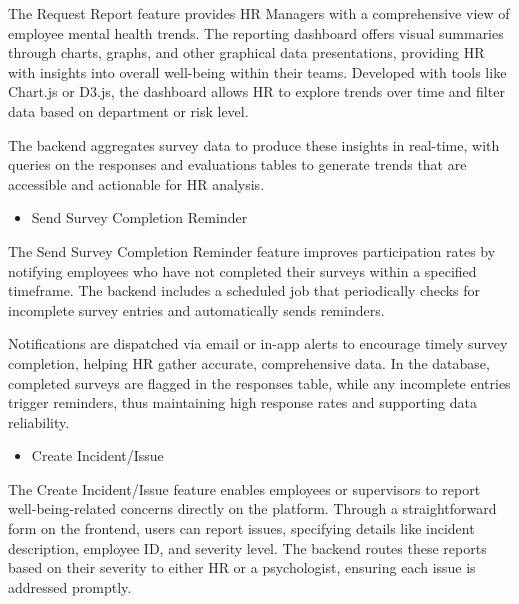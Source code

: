 \documentclass[conference]{IEEEtran}
\begin{document}
    The Request Report feature provides HR Managers with a 
    comprehensive view of employee mental health trends. The 
    reporting dashboard offers visual summaries through charts, 
    graphs, and other graphical data presentations, providing HR
     with insights into overall well-being within their teams. 
     Developed with tools like Chart.js or D3.js, the dashboard 
     allows HR to explore trends over time and filter data based 
     on department or risk level. \newline
     
     The backend aggregates survey 
     data to produce these insights in real-time, with queries on 
     the responses and evaluations tables to generate trends that 
     are accessible and actionable for HR analysis.
     \newline    

     \begin{itemize}
        \item Send Survey Completion Reminder
    \end{itemize}
    
    The Send Survey Completion Reminder feature improves 
    participation rates by notifying employees who have not 
    completed their surveys within a specified timeframe. The 
    backend includes a scheduled job that periodically checks 
    for incomplete survey entries and automatically sends 
    reminders. \newline
    
    Notifications are dispatched via email or in-app 
    alerts to encourage timely survey completion, helping HR gather 
    accurate, comprehensive data. In the database, completed surveys 
    are flagged in the responses table, while any incomplete entries
    trigger reminders, thus maintaining high response rates and 
    supporting data reliability.
    \newline    

     \begin{itemize}
        \item Create Incident/Issue
    \end{itemize}
    
    The Create Incident/Issue feature enables employees or supervisors 
    to report well-being-related concerns directly on the platform. 
    Through a straightforward form on the frontend, users can report 
    issues, specifying details like incident description, employee ID, 
    and severity level. The backend routes these reports based on their 
    severity to either HR or a psychologist, ensuring each issue is 
    addressed promptly. \newline
    
\end{document}
